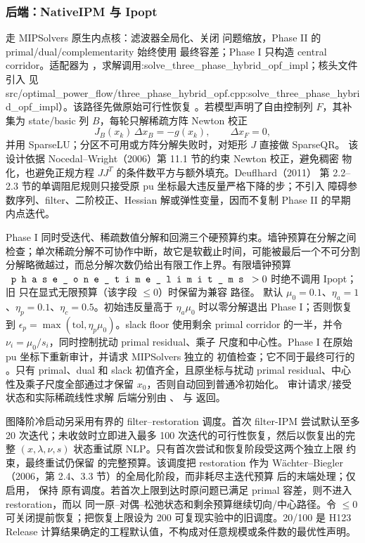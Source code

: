 \subsubsection*{后端：NativeIPM 与 Ipopt}
 走 MIPSolvers 原生内点核：滤波器全局化、关闭
问题缩放，Phase II 的 primal/dual/complementarity 始终使用
 最终容差；Phase I 只构造 central corridor。适配器为
，求解调用:solve\_three\_phase\_hybrid\_opf\_impl；核头文件引入
见 src/optimal\_power\_flow/three\_phase\_hybrid\_opf.cpp:solve\_three\_phase\_hybrid\_opf\_impl）。该路径先做原始可行性恢复
。若模型声明了自由控制列 $F$，其补集为
state/basic 列 $B$，每轮只解稀疏方阵 Newton 校正
\begin{equation}
 J_B(x_k)\,\Delta x_B=-g(x_k),\qquad \Delta x_F=0,
 \label{eq:phase-one-basic-newton}
\end{equation}
并用 SparseLU；分区不可用或方阵分解失败时，对矩形 $J$ 直接做 SparseQR。
该设计依据 Nocedal--Wright（2006）第 11.1 节的约束 Newton 校正，避免稠密
物化，也避免正规方程 $JJ^T$ 的条件数平方与额外填充。Deuflhard（2011）
第 2.2--2.3 节的单调阻尼规则只接受原 pu 坐标最大违反量严格下降的步；不引入
障碍参数序列、filter、二阶校正、Hessian 解或弹性变量，因而不复制 Phase II
的早期内点迭代。

Phase I 同时受迭代、稀疏数值分解和回溯三个硬预算约束。墙钟预算在分解之间
检查；单次稀疏分解不可协作中断，故它是软截止时间，可能被最后一个不可分割
分解略微越过，而总分解次数仍给出有限工作上界。有限墙钟预算
$\fld{phase\_one\_time\_limit\_ms}>0$ 时绝不调用 Ipopt；旧
 只在显式无限预算（该字段 $\le0$）时保留为兼容
路径。
默认 $\mu_0=0.1$、$\eta_a=1$、$\eta_p=0.1$、$\eta_c=0.5$。初始违反量高于
$\eta_a\mu_0$ 时以零分解退出 Phase I；否则恢复到
$\epsilon_p=\max(\mathrm{tol},\eta_p\mu_0)$。slack floor 使用剩余 primal
corridor 的一半，并令 $\nu_i=\mu_0/s_i$，同时控制扰动 primal residual、乘子
尺度和中心性。Phase I 在原始 pu 坐标下重新审计，并请求 MIPSolvers 独立的
 初值检查；它不同于最终可行的
。只有 primal、dual 和 slack 初值齐全，且原坐标与扰动 primal
residual、中心性及乘子尺度全部通过才保留 $x_0$，否则自动回到普通冷初始化。
审计请求/接受状态和实际稀疏线性求解
后端分别由 、
 与
 返回。

图降阶冷启动另采用有界的 filter--restoration 调度。首次 filter-IPM 尝试默认至多
20 次迭代；未收敛时立即进入最多 100 次迭代的可行性恢复，然后以恢复出的完整
$(x,\lambda,\nu,s)$ 状态重试原 NLP。只有首次尝试和恢复阶段受这两个独立上限
约束，最终重试仍保留  的完整预算。该调度把 restoration
作为 Wächter--Biegler（2006，第 2.4、3.3 节）的全局化阶段，而非耗尽主迭代预算
后的末端处理；仅  启用， 保持
原有调度。若首次上限到达时原问题已满足 primal 容差，则不进入 restoration，而以
同一原--对偶--松弛状态和剩余预算继续切向/中心路径。令
$\le0$
可关闭提前恢复；把恢复上限设为 200 可复现实验中的旧调度。20/100 是 H123
Release 计算结果确定的工程默认值，不构成对任意规模或条件数的最优性声明。

